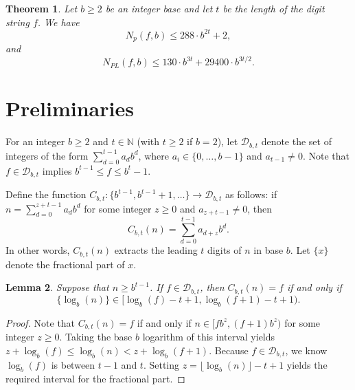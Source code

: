 \documentclass[12pt]{amsart}
\numberwithin{equation}{section}
\newtheorem{thm}{Theorem}[section]
\newtheorem{lem}[thm]{Lemma}
\newcommand{\N}{\mathbb{N}}
\begin{document}
\begin{thm}
\label{PartitionDigitthm}
Let $b \geq 2$ be an integer base and let $t$ be the length of the digit string $f$. We have
\begin{equation*}
N_{p}(f,b) \leq 288 \cdot b^{2t}+2,
\end{equation*}
and
\begin{equation*}
N_{PL}(f,b) \leq 130 \cdot b^{3t} + 29400 \cdot b^{3t/2}.
\end{equation*}
\end{thm}

\section{Preliminaries}

For an integer $b \geq 2$ and $t \in \N$ (with $t \geq 2$ if $b = 2$), let $\mathcal{D}_{b,t}$ denote the set of integers of the form $\sum_{d=0}^{t-1}a_{d} b^{d}$, where $a_{i} \in \{0,\ldots,b-1\}$ and $a_{t-1} \neq 0$. Note that $f \in \mathcal{D}_{b,t}$ implies $b^{t-1} \le f \le b^t - 1$. 

Define the function $C_{b,t}: \{b^{t-1}, b^{t-1}+1,\ldots\} \rightarrow \mathcal{D}_{b,t}$ as follows: if $n = \sum_{d=0}^{z+t-1}a_{d} b^{d}$ for some integer $z \geq 0$ and $a_{z+t-1} \neq 0$, then 
\begin{equation*}
C_{b,t}(n) = \sum_{d=0}^{t-1}a_{d+z} b^{d}.
\end{equation*}
In other words, $C_{b,t}(n)$ extracts the leading $t$ digits of $n$ in base $b$. Let $\{x\}$ denote the fractional part of $x$.

\begin{lem}
\label{logdigitmod1}
Suppose that $n \geq b^{t-1}$. If $f \in \mathcal{D}_{b,t}$, then $C_{b,t}(n) = f$ if and only if 
\begin{equation*}
\{\log_{b}(n)\} \in [\log_{b}(f)-t+1, \log_{b}(f+1)-t+1).
\end{equation*}
\end{lem}
\begin{proof}
Note that $C_{b,t}(n) = f$ if and only if $n \in [fb^{z},(f+1)b^z)$ for some integer $z \geq 0$. Taking the base $b$ logarithm of this interval yields $z + \log_b(f) \le \log_b(n) < z + \log_b(f+1)$. Because $f \in \mathcal{D}_{b,t}$, we know $\log_b(f)$ is between $t-1$ and $t$. Setting $z = \lfloor \log_b(n) \rfloor - t + 1$ yields the required interval for the fractional part.
\end{proof}
\end{document}
